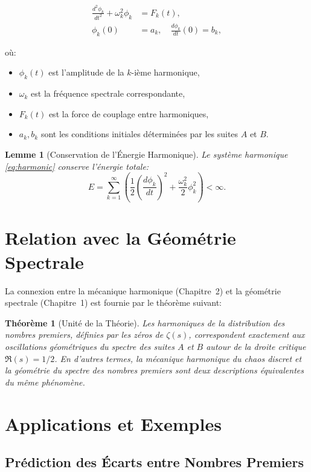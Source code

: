 \documentclass[12pt,a4paper]{article}
\newtheorem{theoreme}{Théorème}
\newtheorem{lemme}{Lemme}
\begin{document}
\begin{align}
  \frac{d^2 \phi_k}{dt^2} + \omega_k^2 \phi_k &= F_k(t), \label{eq:harmonic}\\
  \phi_k(0) &= a_k, \quad \frac{d\phi_k}{dt}(0) = b_k,
\end{align}

où:
\begin{itemize}
  \item $\phi_k(t)$ est l'amplitude de la $k$-ième harmonique,
  \item $\omega_k$ est la fréquence spectrale correspondante,
  \item $F_k(t)$ est la force de couplage entre harmoniques,
  \item $a_k, b_k$ sont les conditions initiales déterminées par les suites $A$ et $B$.
\end{itemize}

\begin{lemme}[Conservation de l'Énergie Harmonique]
Le système harmonique \eqref{eq:harmonic} conserve l'énergie totale:
\[
  E = \sum_{k=1}^{\infty} \left(\frac{1}{2}\left(\frac{d\phi_k}{dt}\right)^2 +
  \frac{\omega_k^2}{2}\phi_k^2\right) < \infty.
\]
\end{lemme}

\section{Relation avec la Géométrie Spectrale}

La connexion entre la mécanique harmonique (Chapitre~2) et la géométrie spectrale
(Chapitre~1) est fournie par le théorème suivant:

\begin{theoreme}[Unité de la Théorie]
Les harmoniques de la distribution des nombres premiers, définies par les zéros de
$\zeta(s)$, correspondent exactement aux oscillations géométriques du spectre des
suites $A$ et $B$ autour de la droite critique $\Re(s) = 1/2$.
En d'autres termes, la mécanique harmonique du chaos discret et la géométrie du
spectre des nombres premiers sont deux descriptions équivalentes du même phénomène.
\end{theoreme}

\section{Applications et Exemples}

\subsection{Prédiction des Écarts entre Nombres Premiers}
\end{document}
